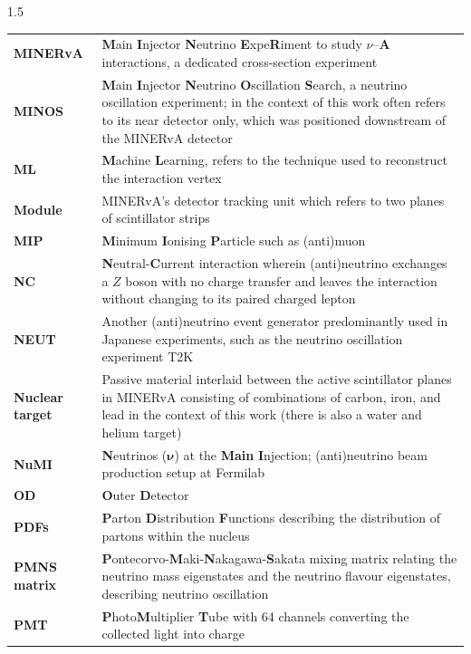\begin{spacing}{1.5}
\begin{longtable}[l]{p{} p{}}
        \textbf{MINERvA} & \textbf{M}ain \textbf{I}njector \textbf{N}eutrino \textbf{E}xpe\textbf{R}iment to study \textbf{$\nu$}--\textbf{A} interactions, a dedicated cross-section experiment  \\
        \textbf{MINOS} & \textbf{M}ain \textbf{I}njector \textbf{N}eutrino \textbf{O}scillation \textbf{S}earch, a neutrino oscillation experiment; in the context of this work often refers to its near detector only, which was positioned downstream of the MINERvA detector  \\
        \textbf{ML} & \textbf{M}achine \textbf{L}earning, refers to the technique used to reconstruct the interaction vertex \\
        \textbf{Module} & MINERvA's detector tracking unit which refers to two planes of scintillator strips  \\
        \textbf{MIP} & \textbf{M}inimum \textbf{I}onising \textbf{P}article such as (anti)muon   \\
        \textbf{NC} & \textbf{N}eutral-\textbf{C}urrent interaction wherein (anti)neutrino exchanges a $Z$ boson with no charge transfer and leaves the interaction without changing to its paired charged lepton \\
        \textbf{NEUT} & Another (anti)neutrino event generator predominantly used in Japanese experiments, such as the neutrino oscillation experiment T2K  \\
        \textbf{Nuclear target} & Passive material interlaid between the active scintillator planes in MINERvA consisting of combinations of carbon, iron, and lead in the context of this work (there is also a water and helium target)  \\
        \textbf{NuMI} & \textbf{N}eutrinos ({$\bm{\nu}$}) at the \textbf{Main} \textbf{I}njection; (anti)neutrino beam production setup at Fermilab   \\
        \textbf{OD} & \textbf{O}uter \textbf{D}etector   \\
        \textbf{PDFs} & \textbf{P}arton \textbf{D}istribution \textbf{F}unctions describing the distribution of partons within the nucleus  \\
        \textbf{PMNS matrix} & \textbf{P}ontecorvo-\textbf{M}aki-\textbf{N}akagawa-\textbf{S}akata mixing matrix relating the neutrino mass eigenstates and the neutrino flavour eigenstates, describing neutrino oscillation  \\
        \textbf{PMT} & \textbf{P}hoto\textbf{M}ultiplier \textbf{T}ube with 64 channels converting the collected light into charge \\

\end{longtable}
\end{spacing}
